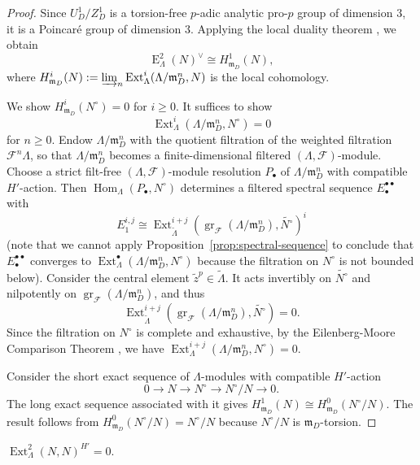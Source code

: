 \documentclass[11pt,a4paper]{article} %
\def\cF{\mathcal{F}}
\def\E{\operatorname{E}}
\def\Ext{\operatorname{Ext}} %
\def\gr{\operatorname{gr}}
\def\Hom{\operatorname{Hom}}
\begin{document}
\begin{proof}
    Since $U_D^1/Z_D^1$ is a torsion-free $p$-adic analytic pro-$p$ group of dimension $3$, it is a Poincaré group of dimension $3$. Applying the local duality theorem \cite[Theorem 7.2]{TV}, we obtain
    \[
    \E_{\Lambda}^2(N)^\vee\cong H_{\mathfrak{m}_D}^1(N),
    \]
    where $H_{\mathfrak{m}_D}^i(N):=\varinjlim_n\Ext_{\Lambda}^i(\Lambda/\mathfrak{m}_D^n,N)$ is the local cohomology. 

    We show $H_{\mathfrak{m}_D}^i(N^\circ)=0$ for $i\ge0$. It suffices to show 
    \[
    \Ext_{\Lambda}^i(\Lambda/\mathfrak{m}_D^n,N^\circ)=0
    \]
    for $n\ge0$. Endow $\Lambda/\mathfrak{m}_D^n$ with the quotient filtration of the weighted filtration $\cF^n\Lambda$, so that $\Lambda/\mathfrak{m}_D^n$ becomes a finite-dimensional filtered $(\Lambda,\cF)$-module. Choose a strict filt-free $(\Lambda,\cF)$-module resolution $P_\bullet$ of $\Lambda/\mathfrak{m}_D^n$ with compatible $H'$-action. Then $\Hom_\Lambda(P_\bullet,N^\circ)$ determines a filtered spectral sequence $E_\bullet^{\bullet\bullet}$ with 
    \[
    E_1^{i,j}\cong\Ext_{\widetilde{\Lambda}}^{i+j}\left(\gr_{\cF}(\Lambda/\mathfrak{m}_D^n),\widetilde{N^\circ}\right)^i
    \]
    (note that we cannot apply Proposition~\ref{prop:spectral-sequence} to conclude that $E_\bullet^{\bullet\bullet}$ converges to $\Ext_{\Lambda}^\bullet(\Lambda/\mathfrak{m}_D^n,N^\circ)$ because the filtration on $N^\circ$ is not bounded below). Consider the central element $\widetilde{z}^p\in\widetilde{\Lambda}$. It acts invertibly on $\widetilde{N^\circ}$ and nilpotently on $\gr_{\cF}(\Lambda/\mathfrak{m}_D^n)$, and thus 
    \[
    \Ext_{\widetilde{\Lambda}}^{i+j}\left(\gr_{\cF}(\Lambda/\mathfrak{m}_D^n),\widetilde{N^\circ}\right)=0.
    \]
    Since the filtration on $N^\circ$ is complete and exhaustive, by the Eilenberg-Moore Comparison Theorem \cite[Theorem 5.5.11]{WC}, we have $\Ext_{\Lambda}^{i+j}(\Lambda/\mathfrak{m}_D^n,N^\circ)=0$.

    Consider the short exact sequence of $\Lambda$-modules with compatible $H'$-action
    \[
    0\longrightarrow N\longrightarrow N^\circ\longrightarrow N^\circ/N\longrightarrow0.
    \]
    The long exact sequence associated with it gives $H_{\mathfrak{m}_D}^1(N)\cong H_{\mathfrak{m}_D}^0(N^\circ/N)$. The result follows from $H_{\mathfrak{m}_D}^0(N^\circ/N)=N^\circ/N$ because $N^\circ/N$ is $\mathfrak{m}_D$-torsion.
\end{proof}

\begin{proposition}\label{prop:ext2-vanish}
    $\Ext_{\Lambda}^2(N,N)^{H'}=0$.
\end{proposition}
\end{document}
